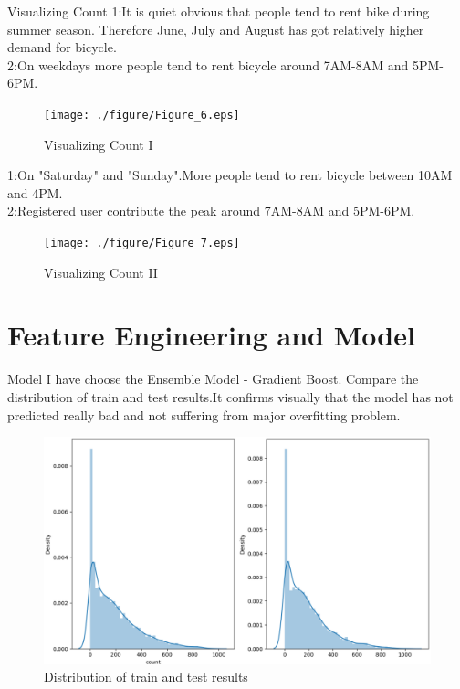 \documentclass[
 size=14pt,
 paper=smartboard,  %
 mode=present, 		%
 display=slides, 	%
 style=tuliplab,  	%
 pauseslide,
 fleqn,leqno]{powerdot}
\begin{document}
\begin{slide}{Visualizing Count}
	1:It is quiet obvious that people tend to rent bike during summer season. Therefore June, July and August has got relatively higher demand for bicycle.\\
	2:On weekdays more people tend to rent bicycle around 7AM-8AM and 5PM-6PM. 
	\begin{figure}[htbp]
		\texttt{[image: ./figure/Figure\_6.eps]}
		\caption{Visualizing Count I}
	\end{figure}
\end{slide}
\begin{slide}{}
	1:On "Saturday" and "Sunday".More people tend to rent bicycle between 10AM and 4PM.\\
	2:Registered user contribute the peak around 7AM-8AM and 5PM-6PM.
	\begin{figure}[htbp]
		\texttt{[image: ./figure/Figure\_7.eps]}
		\caption{Visualizing Count II}
	\end{figure}
\end{slide}

\section{Feature Engineering and Model}
\begin{slide}[toc=,bm=]{Model}
	I have choose the Ensemble Model - Gradient Boost. Compare the distribution of train and test results.It confirms visually that the model has not predicted really bad and not suffering from major overfitting problem.
	\begin{figure}[htbp]
	\includegraphics[scale=0.5]{./figure/models_Figure_1.eps}
	\caption{Distribution of train and test results}
	\end{figure}
\end{slide}
\end{document}
